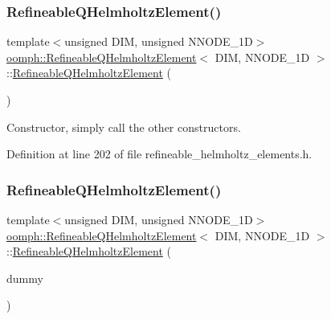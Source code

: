 \subsubsection{\texorpdfstring{Refineable\+Q\+Helmholtz\+Element()}{RefineableQHelmholtzElement()}\hspace{0.1cm}{\footnotesize\ttfamily [1/2]}}
{\footnotesize\ttfamily template$<$unsigned D\+IM, unsigned N\+N\+O\+D\+E\+\_\+1D$>$ \\
\hyperlink{classoomph_1_1RefineableQHelmholtzElement}{oomph\+::\+Refineable\+Q\+Helmholtz\+Element}$<$ D\+IM, N\+N\+O\+D\+E\+\_\+1D $>$\+::\hyperlink{classoomph_1_1RefineableQHelmholtzElement}{Refineable\+Q\+Helmholtz\+Element} (\begin{DoxyParamCaption}{ }\end{DoxyParamCaption})\hspace{0.3cm}{\ttfamily [inline]}}



Constructor, simply call the other constructors. 



Definition at line 202 of file refineable\+\_\+helmholtz\+\_\+elements.\+h.

\mbox{\label{classoomph_1_1RefineableQHelmholtzElement_a95a25f8d79eddcdb032d4c53683a8464}} 
\subsubsection{\texorpdfstring{Refineable\+Q\+Helmholtz\+Element()}{RefineableQHelmholtzElement()}\hspace{0.1cm}{\footnotesize\ttfamily [2/2]}}
{\footnotesize\ttfamily template$<$unsigned D\+IM, unsigned N\+N\+O\+D\+E\+\_\+1D$>$ \\
\hyperlink{classoomph_1_1RefineableQHelmholtzElement}{oomph\+::\+Refineable\+Q\+Helmholtz\+Element}$<$ D\+IM, N\+N\+O\+D\+E\+\_\+1D $>$\+::\hyperlink{classoomph_1_1RefineableQHelmholtzElement}{Refineable\+Q\+Helmholtz\+Element} (\begin{DoxyParamCaption}\item[{const \hyperlink{classoomph_1_1RefineableQHelmholtzElement}{Refineable\+Q\+Helmholtz\+Element}$<$ D\+IM, N\+N\+O\+D\+E\+\_\+1D $>$ \&}]{dummy }\end{DoxyParamCaption})\hspace{0.3cm}{\ttfamily [inline]}}



